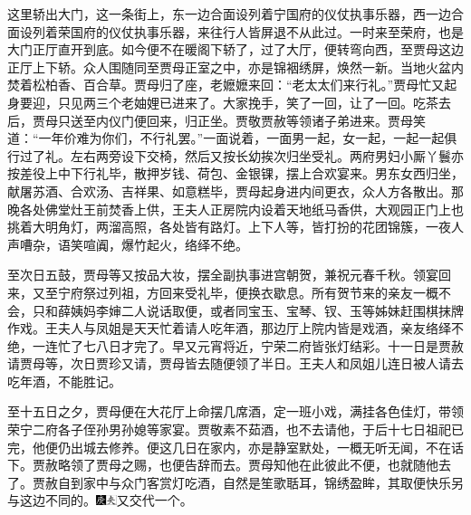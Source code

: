 这里轿出大门，这一条街上，东一边合面设列着宁国府的仪仗执事乐器，西一边合面设列着荣国府的仪仗执事乐器，来往行人皆屏退不从此过。一时来至荣府，也是大门正厅直开到底。如今便不在暖阁下轿了，过了大厅，便转弯向西，至贾母这边正厅上下轿。众人围随同至贾母正室之中，亦是锦裀绣屏，焕然一新。当地火盆内焚着松柏香、百合草。贾母归了座，老嬷嬷来回：``老太太们来行礼。''贾母忙又起身要迎，只见两三个老妯娌已进来了。大家挽手，笑了一回，让了一回。吃茶去后，贾母只送至内仪门便回来，归正坐。贾敬贾赦等领诸子弟进来。贾母笑道：``一年价难为你们，不行礼罢。''一面说着，一面男一起，女一起，一起一起俱行过了礼。左右两旁设下交椅，然后又按长幼挨次归坐受礼。两府男妇小厮丫鬟亦按差役上中下行礼毕，散押岁钱、荷包、金银锞，摆上合欢宴来。男东女西归坐，献屠苏酒、合欢汤、吉祥果、如意糕毕，贾母起身进内间更衣，众人方各散出。那晚各处佛堂灶王前焚香上供，王夫人正房院内设着天地纸马香供，大观园正门上也挑着大明角灯，两溜高照，各处皆有路灯。上下人等，皆打扮的花团锦簇，一夜人声嘈杂，语笑喧阗，爆竹起火，络绎不绝。

至次日五鼓，贾母等又按品大妆，摆全副执事进宫朝贺，兼祝元春千秋。领宴回来，又至宁府祭过列祖，方回来受礼毕，便换衣歇息。所有贺节来的亲友一概不会，只和薛姨妈李婶二人说话取便，或者同宝玉、宝琴、钗、玉等姊妹赶围棋抹牌作戏。王夫人与凤姐是天天忙着请人吃年酒，那边厅上院内皆是戏酒，亲友络绎不绝，一连忙了七八日才完了。早又元宵将近，宁荣二府皆张灯结彩。十一日是贾赦请贾母等，次日贾珍又请，贾母皆去随便领了半日。王夫人和凤姐儿连日被人请去吃年酒，不能胜记。

至十五日之夕，贾母便在大花厅上命摆几席酒，定一班小戏，满挂各色佳灯，带领荣宁二府各子侄孙男孙媳等家宴。贾敬素不茹酒，也不去请他，于后十七日祖祀已完，他便仍出城去修养。便这几日在家内，亦是静室默处，一概无听无闻，不在话下。贾赦略领了贾母之赐，也便告辞而去。贾母知他在此彼此不便，也就随他去了。贾赦自到家中与众门客赏灯吃酒，自然是笙歌聒耳，锦绣盈眸，其取便快乐另与这边不同的。{\includegraphics[width=3mm]{../Images/00004}\includegraphics[width=3mm]{../Images/00012}\footnotesize \kaishu 又交代一个。}

